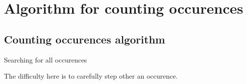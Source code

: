 \chapter{Algorithm for counting occurences}


\section{Counting occurences algorithm}

Searching for all occurences 

The difficulty here is to carefully step other an occurence. 

